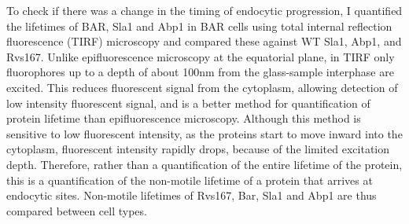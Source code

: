 To check if there was a change in the timing of endocytic progression, I quantified the lifetimes of BAR, Sla1 and Abp1 in BAR cells using total internal reflection fluorescence (TIRF) microscopy and compared these against WT Sla1, Abp1, and Rvs167. Unlike epifluorescence microscopy at the equatorial plane, in TIRF only fluorophores up to a depth of about 100nm from the glass-sample interphase are excited. This reduces fluorescent signal from the cytoplasm, allowing detection of low intensity fluorescent signal, and is a better method for quantification of protein lifetime than epifluorescence microscopy. Although this method is sensitive to low fluorescent intensity, as the proteins start to move inward into the cytoplasm, fluorescent intensity rapidly drops, because of the limited excitation depth. Therefore, rather than a quantification of the entire lifetime of the protein, this is a quantification of the non-motile lifetime of a protein that arrives at endocytic sites. Non-motile lifetimes of Rvs167, Bar, Sla1 and Abp1 are thus compared between cell types. 




